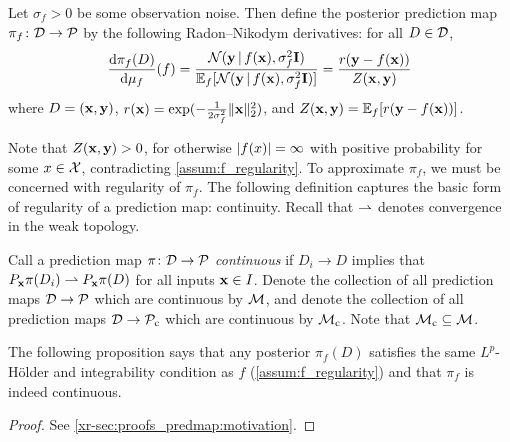\documentclass[12pt, twoside]{report}
\newcommand{\xrprefix}[1]{xr-#1}
\begin{document}
\begin{definition}
    \label{def:posterior_prediction_map_formal}
    Let $\sigma_f > 0$ be some observation noise.
    Then define the posterior prediction map $\pi_f\colon \D \to \Pc$
    by the following Radon--Nikodym derivatives:
    for all $D \in \D$,
    \begin{equation} \label{eq:density_posterior_prediction_map}
        \frac{\sd \pi_f(D)}{\sd \mu_f}(f)
        =
        \frac
            {\Normal(\vy \cond f(\vx), \sigma_f^2 \mI)}
            {\E_f[\Normal(\vy \cond f(\vx), \sigma_f^2 \mI)]}
        =
        \frac
            {r(\vy - f(\vx))}
            {Z(\vx, \vy)}
    \end{equation}
    where $D = (\vx, \vy)$,
    $r(\vx) = \exp({-\tfrac{1}{2\sigma_f^2}\norm{\vx}_2^2})$,
    and $Z(\vx, \vy) = \E_f[r(\vy - f(\vx))]$.
\end{definition}

Note that $Z(\vx, \vy) > 0$, for otherwise $\abs{f(x)} = \infty$ with positive probability for some $x \in \X$, contradicting \cref{assum:f_regularity}.
To approximate $\pi_f$, we must be concerned with regularity of $\pi_f$.
The following definition captures the basic form of regularity of a prediction map: continuity.
Recall that $\weakto$ denotes convergence in the weak topology.

\begin{definition}
    \label{def:continuous_prediction_map}
    Call a prediction map $\pi\colon \D \to \Pc$ \emph{continuous} if
    $D_i \to D$
    implies that 
    $P_\vx \pi(D_i) \weakto P_\vx \pi(D)$ 
    for all inputs $\vx \in I$. 
    Denote the collection of all prediction maps $\D \to \Pc$ which are continuous by $\M$,
    and denote the collection of all prediction maps $\D \to \Pc\ss{c}$ which are continuous by $\M\ss{c}$.
    Note that $\M\ss{c} \sub \M$.
\end{definition}

The following proposition says that any posterior $\pi_f(D)$ satisfies the same $L^p$-H\"older and integrability condition as $f$ (\cref{assum:f_regularity}) and that $\pi_f$ is indeed continuous.

\begin{proof}
    See \cref{\xrprefix{sec:proofs_predmap:motivation}}.
\end{proof}
\end{document}
